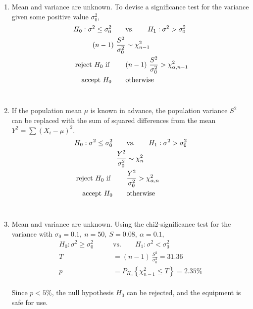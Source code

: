\begin{enumerate}
	\item Mean and variance are unknown. To devise a significance test for the variance given some positive value $ \sigma^2_0 $, \\
	
	\begin{align}
		H_0 : \sigma^2 \leq \sigma_0^2 \qquad &\text{vs.} \qquad H_1 : \sigma^2 > \sigma_0^2 \nonumber \\
		(n-1)\ \frac{S^2}{\sigma_0^2} &\sim \chi^2_{n-1} \nonumber \\
		\text{reject $ H_0 $ if } \qquad & (n-1)\ \frac{S^2}{\sigma_0^2} > \chi^2_{\alpha, n-1} \\
		\text{accept $ H_0 $} \qquad & \text{otherwise}
	\end{align} \\

	\item If the population mean $ \mu $ is known in advance, the population variance $ S^2 $ can be replaced with the sum of squared differences from the mean $ Y^2 = \sum (X_i - \mu)^2 $.\\
	 
	\begin{align}
		H_0 : \sigma^2 \leq \sigma_0^2 \qquad &\text{vs.} \qquad H_1 : \sigma^2 > \sigma_0^2 \nonumber \\
		\frac{Y^2}{\sigma_0^2} &\sim \chi^2_{n} \nonumber \\
		\text{reject $ H_0 $ if } \qquad & \frac{Y^2}{\sigma_0^2} > \chi^2_{\alpha, n} \\
		\text{accept $ H_0 $} \qquad & \text{otherwise}
	\end{align} \\

	\item Mean and variance are unknown. Using the chi2-significance test for the variance with $ \sigma_0 = 0.1,\ n = 50,\ S = 0.08,\ \alpha = 0.1 $, \\
	
	\begin{align}
		H_0 : \sigma^2 \geq \sigma_0^2 \qquad &\text{vs.} \qquad H_1 : \sigma^2 < \sigma_0^2 \nonumber \\
		T &= (n-1)\ \frac{S^2}{\sigma_0^2} = 31.36 \nonumber \\
		p &= P_{H_0}\left\{\chi^2_{n-1} \leq T\right\} = 2.35\% 
	\end{align} \\
	Since $ p < 5\% $, the null hypothesis $ H_0 $ can be rejected, and the equipment is safe for use.\\
	

\end{enumerate}
